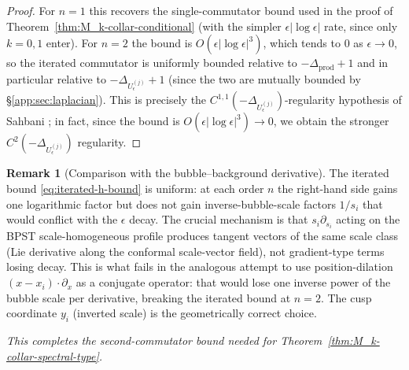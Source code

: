 \documentclass[11pt,letterpaper]{article}
\theoremstyle{definition}
\newtheorem{remark}[theorem]{Remark}
\newcommand{\Lap}{\Delta}
\begin{document}
\begin{proof}
For $n=1$ this recovers the single-commutator bound used in the proof of Theorem~\ref{thm:M_k-collar-conditional} (with the simpler $\epsilon|\log\epsilon|$ rate, since only $k=0,1$ enter). For $n=2$ the bound is $O(\epsilon|\log\epsilon|^3)$, which tends to $0$ as $\epsilon \to 0$, so the iterated commutator is uniformly bounded relative to $-\Lap_{\mathrm{prod}}+1$ and in particular relative to $-\Lap_{U_\epsilon^{(j)}}+1$ (since the two are mutually bounded by \S\ref{app:sec:laplacian}). This is precisely the $C^{1,1}(-\Lap_{U_\epsilon^{(j)}})$-regularity hypothesis of Sahbani \cite[Hyp.~H1--H3]{Sahbani1997}; in fact, since the bound is $O(\epsilon|\log\epsilon|^3)\to 0$, we obtain the stronger $C^2(-\Lap_{U_\epsilon^{(j)}})$ regularity.
\end{proof}

\begin{remark}[Comparison with the bubble--background derivative]\label{rmk:iterated-honest}
The iterated bound \eqref{eq:iterated-h-bound} is uniform: at each order $n$ the right-hand side gains one logarithmic factor but does not gain inverse-bubble-scale factors $1/s_i$ that would conflict with the $\epsilon$ decay. The crucial mechanism is that $s_i\partial_{s_i}$ acting on the BPST scale-homogeneous profile produces tangent vectors of the same scale class (Lie derivative along the conformal scale-vector field), not gradient-type terms losing decay. This is what fails in the analogous attempt to use position-dilation $(x-x_i)\cdot\partial_x$ as a conjugate operator: that would lose one inverse power of the bubble scale per derivative, breaking the iterated bound at $n=2$. The cusp coordinate $y_i$ (inverted scale) is the geometrically correct choice.
\end{remark}

\medskip

\noindent\textit{This completes the second-commutator bound needed for Theorem~\ref{thm:M_k-collar-spectral-type}.}
\end{document}
